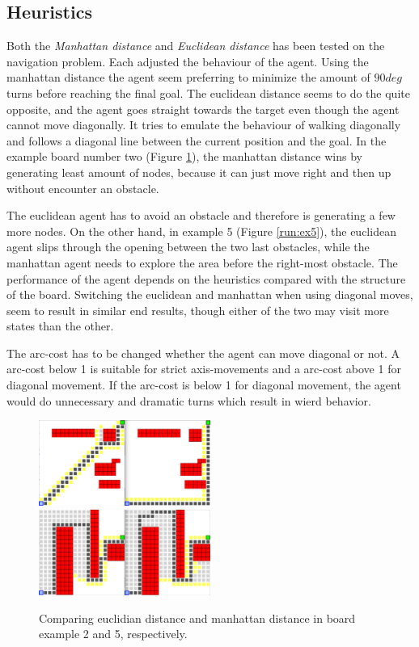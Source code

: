 \subsection{Heuristics}
Both the \emph{Manhattan distance} and \emph{Euclidean distance} has been tested on the navigation problem. Each adjusted the behaviour of the agent. Using the manhattan distance the agent seem preferring to minimize the amount of \(90 deg\) turns before reaching the final goal. The euclidean distance seems to do the quite opposite, and the agent goes straight towards the target even though the agent cannot move diagonally. It tries to emulate the behaviour of walking diagonally and follows a diagonal line between the current position and the goal. In the example board number two (Figure \ref{run:ex2}), the manhattan distance wins by generating least amount of nodes, because it can just move right and then up without encounter an obstacle. 

The euclidean agent has to avoid an obstacle and therefore is generating a few more nodes. On the other hand, in example 5 (Figure \ref{run:ex5}), the euclidean agent slips through the opening between the two last obstacles, while the manhattan agent needs to explore the area before the right-most obstacle. The performance of the agent depends on the heuristics compared with the structure of the board. Switching the euclidean and manhattan when using diagonal moves, seem to result in similar end results, though either of the two may visit more states than the other.

The arc-cost has to be changed whether the agent can move diagonal or not. A arc-cost below 1 is suitable for strict axis-movements and a arc-cost above 1 for diagonal movement. If the arc-cost is below 1 for diagonal movement, the agent would do unnecessary and dramatic turns which result in wierd behavior.

\begin{figure}[h!]
	\centering
	\begin{minipage}{\textwidth}
		\includegraphics[width=0.5\textwidth]{module_1/images/run_ex2}
		\includegraphics[width=0.5\textwidth]{module_1/images/run_ex5}
	\end{minipage}
	\caption{Comparing euclidian distance and manhattan distance in board example 2 and 5, respectively.}
	\label{run:ex2}
\end{figure}

